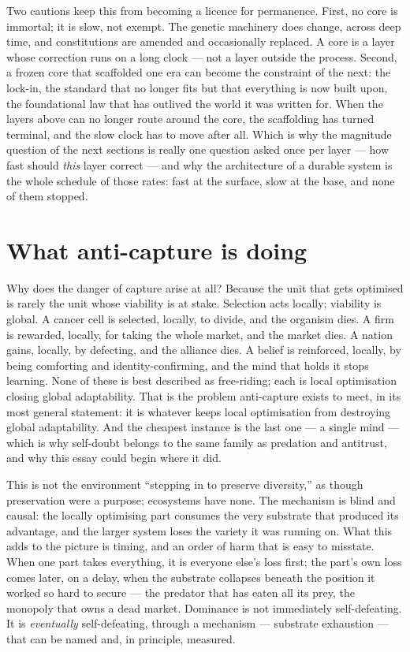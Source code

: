 \documentclass[11pt, a4paper]{report}
\begin{document}
Two cautions keep this from becoming a licence for permanence. First, no core is immortal; it is slow, not exempt. The genetic machinery does change, across deep time, and constitutions are amended and occasionally replaced. A core is a layer whose correction runs on a long clock --- not a layer outside the process. Second, a frozen core that scaffolded one era can become the constraint of the next: the lock-in, the standard that no longer fits but that everything is now built upon, the foundational law that has outlived the world it was written for. When the layers above can no longer route around the core, the scaffolding has turned terminal, and the slow clock has to move after all. Which is why the magnitude question of the next sections is really one question asked once per layer --- how fast should \textit{this} layer correct --- and why the architecture of a durable system is the whole schedule of those rates: fast at the surface, slow at the base, and none of them stopped.

\section{What anti-capture is doing}

Why does the danger of capture arise at all? Because the unit that gets optimised is rarely the unit whose viability is at stake. Selection acts locally; viability is global. A cancer cell is selected, locally, to divide, and the organism dies. A firm is rewarded, locally, for taking the whole market, and the market dies. A nation gains, locally, by defecting, and the alliance dies. A belief is reinforced, locally, by being comforting and identity-confirming, and the mind that holds it stops learning. None of these is best described as free-riding; each is local optimisation closing global adaptability. That is the problem anti-capture exists to meet, in its most general statement: it is whatever keeps local optimisation from destroying global adaptability. And the cheapest instance is the last one --- a single mind --- which is why self-doubt belongs to the same family as predation and antitrust, and why this essay could begin where it did.

This is not the environment ``stepping in to preserve diversity,'' as though preservation were a purpose; ecosystems have none. The mechanism is blind and causal: the locally optimising part consumes the very substrate that produced its advantage, and the larger system loses the variety it was running on. What this adds to the picture is timing, and an order of harm that is easy to misstate. When one part takes everything, it is everyone else's loss first; the part's own loss comes later, on a delay, when the substrate collapses beneath the position it worked so hard to secure --- the predator that has eaten all its prey, the monopoly that owns a dead market. Dominance is not immediately self-defeating. It is \textit{eventually} self-defeating, through a mechanism --- substrate exhaustion --- that can be named and, in principle, measured.
\end{document}

